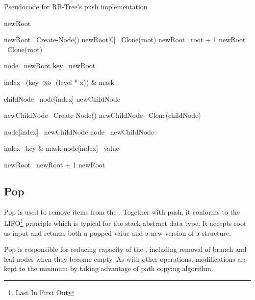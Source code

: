 \begin{listing}[ht!]
    \caption{Pseudocode for RB-Tree's push implementation}
    \label{lst:rb-tree-push}

    \begin{algorithmic}
            \State newRoot \la\ \nil{}

                \State newRoot \la\ Create-Node()
                \State newRoot[0] \la\ Clone(root)
                \State newRoot \la\ root + 1
            \Else
                \State newRoot \la\ Clone(root)
            \EndIf

            \State node \la\ newRoot
            \State key \la\ newRoot

                \State index \la\ (key $\ggg$ (level * x)) \& mask

                \State childNode \la\ node[index]
                \State newChildNode \la\ \nil{}

                    \State newChildNode \la\ Create-Node()
                \Else
                    \State newChildNode \la\ Clone(childNode)
                \EndIf

                \State node[index] \la\ newChildNode
                \State node \la\ newChildNode
            \EndFor

            \State index \la\ key \& mask
            \State node[index] \la\ value

            \State newRoot \la\ newRoot + 1
            \State \Return newRoot
        \EndFunction
    \end{algorithmic}
\end{listing}

\subsection{Pop}
Pop is used to remove items from the \rbtree. Together with push, it conforms to the LIFO\footnote{Last In First Out} principle which is typical for the stack abstract data type. It accepts root as input and returns both a popped value and a new version of a structure.

Pop is responsible for reducing capacity of the \rbtree{}, including removal of branch and leaf nodes when they become empty. As with other operations, modifications are kept to the minimum by taking advantage of path copying algorithm.

